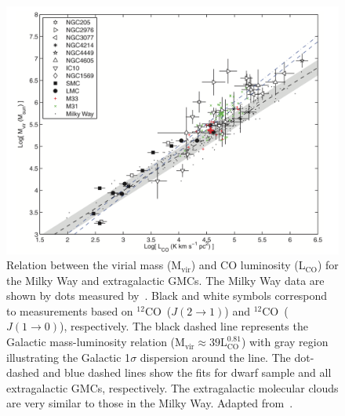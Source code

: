 \begin{figure}
\centering
\includegraphics[width=\textwidth]{../image_intro/mvirial_lco.png}
\caption[Relation between the virial mass and CO luminosity]{Relation between the virial mass (M$_{\mathrm{vir}}$) and CO luminosity (L$_{\mathrm{CO}}$) for the Milky Way and extragalactic GMCs. The Milky Way data are shown by dots measured by~\cite{Solomon87}. Black and white symbols correspond to measurements based on $^{12}$CO~($J(2\rightarrow 1)$) and $^{12}$CO~($J(1\rightarrow 0)$), respectively. The black dashed line represents the Galactic mass-luminosity relation (M$_{\mathrm{vir}} \approx 39{\mathrm L}^{0.81}_{\mathrm{CO}}$) with gray region illustrating the Galactic 1$\sigma$ dispersion around the line.
The dot-dashed and blue dashed lines show the fits for dwarf sample and all extragalactic GMCs, respectively.
The extragalactic molecular clouds are very similar to those in the Milky Way. Adapted from~\cite{Bolato08}.}
\label{fig: mco}
\end{figure}

